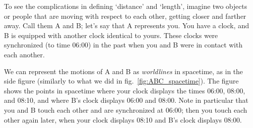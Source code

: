 \documentclass[a4paper,12pt,%
onecolumn,oneside,%
british%
]{memoir}
\renewcommand*{\|}[1][]{\nonscript\:#1\vert\nonscript\:\mathopen{}}
\newcommand*{\fig}{fig.}%
\begin{document}
To see the complications in defining \enquote*{distance} and \enquote*{length}, imagine two objects or people that are moving with respect to each other, getting closer and farther away. Call them A and B; let's say that A represents you. You have a clock, and B is equipped with another clock identical to yours. These clocks were synchronized (to time 06:00) in the past when you and B were in contact with each another.

%
%
We can represent the motions of A and B as \emph{worldlines} in spacetime, as in the side figure (similarly to what we did in \fig~\ref{fig:ABC_spacetime}). The figure shows the points in spacetime where your clock displays the times 06:00, 08:00, and 08:10, and where B's clock displays 06:00 and 08:00. Note in particular that you and B touch each other and are synchronized at 06:00; then you touch each other again later, when your clock displays 08:10 and B's clock displays 08:00.
\end{document}
